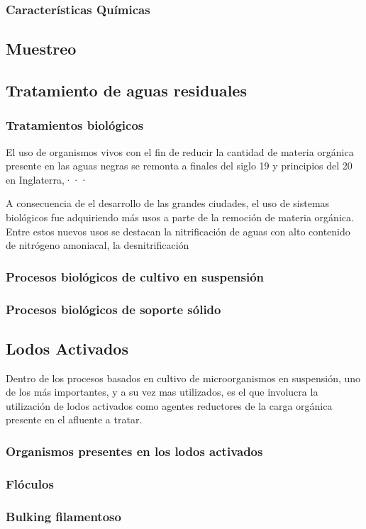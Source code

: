 \subsubsection{Características Químicas}
\subsection{Muestreo}
\subsection{Tratamiento de aguas residuales}

\subsubsection{Tratamientos biológicos}
El uso de organismos vivos con el fin de reducir la cantidad de materia orgánica presente en las aguas negras se remonta a finales del siglo 19 y principios del 20 en Inglaterra,···\par
A consecuencia de el desarrollo de las grandes ciudades, el uso de sistemas biológicos fue adquiriendo más usos a parte de la remoción de materia orgánica. Entre estos nuevos usos se destacan la nitrificación de aguas con alto contenido de nitrógeno amoniacal, la desnitrificación 
\subsubsection*{Procesos biológicos de cultivo en suspensión}
\subsubsection*{Procesos biológicos de soporte sólido}
\subsection{Lodos Activados}
Dentro de los procesos basados en cultivo de microorganismos en suspensión, uno de los más importantes, y a su vez mas utilizados, es el que involucra la utilización de lodos activados como agentes reductores de la carga orgánica presente en el afluente a tratar.
\subsubsection{Organismos presentes en los lodos activados}
\subsubsection{Flóculos}
\subsubsection{Bulking filamentoso}
